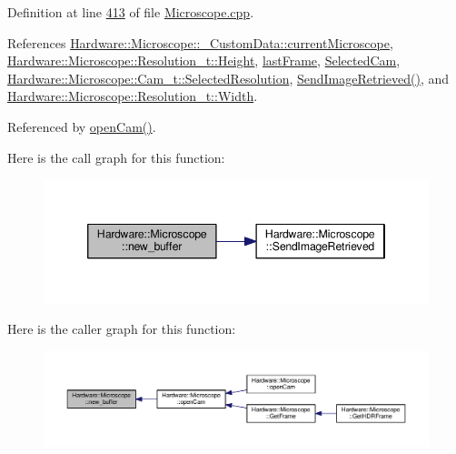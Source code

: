 Definition at line \hyperlink{_microscope_8cpp_source_l00413}{413} of file \hyperlink{_microscope_8cpp_source}{Microscope.\+cpp}.



References \hyperlink{_microscope_8h_source_l00119}{Hardware\+::\+Microscope\+::\+\_\+\+Custom\+Data\+::current\+Microscope}, \hyperlink{_microscope_8h_source_l00059}{Hardware\+::\+Microscope\+::\+Resolution\+\_\+t\+::\+Height}, \hyperlink{_microscope_8h_source_l00175}{last\+Frame}, \hyperlink{_microscope_8h_source_l00149}{Selected\+Cam}, \hyperlink{_microscope_8h_source_l00128}{Hardware\+::\+Microscope\+::\+Cam\+\_\+t\+::\+Selected\+Resolution}, \hyperlink{_microscope_8cpp_source_l00411}{Send\+Image\+Retrieved()}, and \hyperlink{_microscope_8h_source_l00058}{Hardware\+::\+Microscope\+::\+Resolution\+\_\+t\+::\+Width}.



Referenced by \hyperlink{_microscope_8cpp_source_l00167}{open\+Cam()}.



Here is the call graph for this function\+:
\nopagebreak
\begin{figure}[H]
\begin{center}
\leavevmode
\includegraphics[width=346pt]{class_hardware_1_1_microscope_a857987ccdcdb8d6b3cb9545eb7a616e8_cgraph}
\end{center}
\end{figure}




Here is the caller graph for this function\+:
\nopagebreak
\begin{figure}[H]
\begin{center}
\leavevmode
\includegraphics[width=350pt]{class_hardware_1_1_microscope_a857987ccdcdb8d6b3cb9545eb7a616e8_icgraph}
\end{center}
\end{figure}


